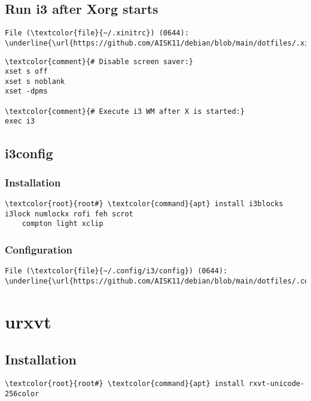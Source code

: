 \documentclass[10pt, a4paper, onecolumn, openany]{book} %
\begin{document}
\subsection{Run i3 after Xorg starts}
\begin{Verbatim}[commandchars=\\\{\}]
File (\textcolor{file}{~/.xinitrc}) (0644):
\underline{\url{https://github.com/AISK11/debian/blob/main/dotfiles/.xinitrc}}
\end{Verbatim}
\begin{Verbatim}[commandchars=\\\{\}]
\textcolor{comment}{# Disable screen saver:}
xset s off
xset s noblank
xset -dpms

\textcolor{comment}{# Execute i3 WM after X is started:}
exec i3
\end{Verbatim}
\subsection{i3config}
\subsubsection{Installation}
\begin{Verbatim}[commandchars=\\\{\}]
    \textcolor{root}{root#} \textcolor{command}{apt} install i3blocks i3lock numlockx rofi feh scrot
    compton light xclip
\end{Verbatim}
\subsubsection{Configuration}
\begin{Verbatim}[commandchars=\\\{\}]   
File (\textcolor{file}{~/.config/i3/config}) (0644):
\underline{\url{https://github.com/AISK11/debian/blob/main/dotfiles/.config/i3/config}}
\end{Verbatim}

\section{urxvt}
\subsection{Installation}
\begin{Verbatim}[commandchars=\\\{\}]
    \textcolor{root}{root#} \textcolor{command}{apt} install rxvt-unicode-256color
\end{Verbatim}
\end{document}
